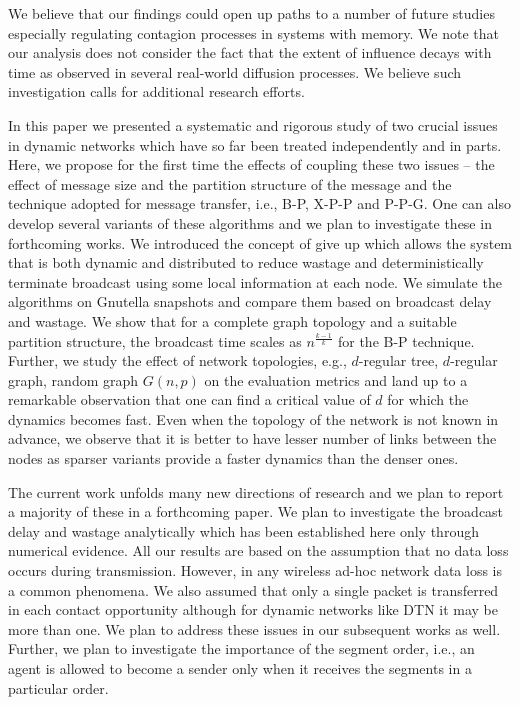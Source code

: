 We believe that our findings could open up paths to a number of future studies especially regulating contagion processes in systems with memory. 
We note that our analysis does not 
consider the fact that the extent of influence decays with time as observed in several real-world diffusion processes. We believe such 
investigation calls for additional research efforts.




In this paper we presented a systematic and rigorous study of two crucial issues in dynamic networks which have 
so far been treated independently and in parts. Here, we propose for the first time the effects of coupling these 
two issues -- the effect of message size and the partition structure of the message and the technique adopted for message transfer, i.e., B-P, X-P-P and 
P-P-G. One can also develop several variants of these algorithms and we plan to investigate these in forthcoming works.
We introduced the concept of give up which allows the system that is both dynamic and distributed 
to reduce wastage and deterministically terminate broadcast using some local information at each node. 
We simulate the algorithms on Gnutella snapshots and compare them based on broadcast delay and wastage.
 We show that for a complete graph topology and a suitable partition structure, 
 the broadcast time scales as $n^{\frac{k-1}{k}}$ for the B-P technique. 
Further, we study the effect of  
network topologies, e.g., $d$-regular tree, $d$-regular graph, random graph $G(n, p)$ on the evaluation metrics and land up to a 
remarkable observation that one can find a critical value of $d$ for which the dynamics becomes fast.
Even when the topology of the network is not known in advance, we observe that it is better to have lesser number of links 
between the nodes as sparser variants provide a faster dynamics than the denser ones.

\vspace{-1mm}
The current work unfolds many new directions of research and we plan to report a majority of these in a forthcoming paper. 
We plan to investigate the broadcast delay and wastage analytically which has been established here only 
through numerical evidence. All our results are based on the assumption that no data loss occurs during transmission. However, in 
any wireless ad-hoc network data loss is a common phenomena. We also assumed that only a single packet is transferred in each 
contact opportunity although for dynamic networks like DTN it may be more than one. We plan to address these issues in our subsequent works as well.
Further, we plan to investigate the importance of the segment order, i.e., an agent is allowed to 
become a sender only when it receives the segments in a particular order. 
\fi

\medskip
